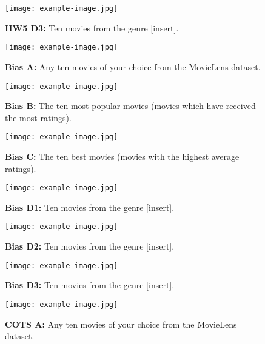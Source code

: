 \begin{figure}[!h]
    \centering
    \texttt{[image: example-image.jpg]}
    \caption{\textbf{HW5 D3:} Ten movies from the genre [insert].}
    \label{fig:hw5_vis_d3}
\end{figure}

\begin{figure}[!h]
    \centering
    \texttt{[image: example-image.jpg]}
    \caption{\textbf{Bias A:} Any ten movies of your choice from the MovieLens dataset.}
    \label{fig:bias_vis_a}
\end{figure}

\begin{figure}[!h]
    \centering
    \texttt{[image: example-image.jpg]}
    \caption{\textbf{Bias B:} The ten most popular movies (movies which have received the most ratings).}
    \label{fig:bias_vis_b}
\end{figure}

\begin{figure}[!h]
    \centering
    \texttt{[image: example-image.jpg]}
    \caption{\textbf{Bias C:} The ten best movies (movies with the highest average ratings).}
    \label{fig:bias_vis_c}
\end{figure}

\begin{figure}[!h]
    \centering
    \texttt{[image: example-image.jpg]}
    \caption{\textbf{Bias D1:} Ten movies from the genre [insert].}
    \label{fig:bias_vis_d1}
\end{figure}

\begin{figure}[!h]
    \centering
    \texttt{[image: example-image.jpg]}
    \caption{\textbf{Bias D2:} Ten movies from the genre [insert].}
    \label{fig:bias_vis_d2}
\end{figure}

\begin{figure}[!h]
    \centering
    \texttt{[image: example-image.jpg]}
    \caption{\textbf{Bias D3:} Ten movies from the genre [insert].}
    \label{fig:bias_vis_d3}
\end{figure}

\begin{figure}[!h]
    \centering
    \texttt{[image: example-image.jpg]}
    \caption{\textbf{COTS A:} Any ten movies of your choice from the MovieLens dataset.}
    \label{fig:cots_vis_a}
\end{figure}

